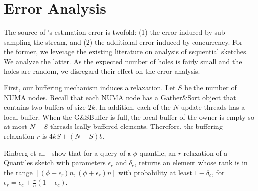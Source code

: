 \section{Error Analysis}
\label{sec:error-analysis}

The source of \mysketch's estimation error is twofold: (1) the error induced by sub-sampling the stream, and (2) the additional error induced by concurrency. For the former, we leverage the existing literature on analysis of sequential sketches. We analyze the latter. 
As the expected number of holes is fairly small and the holes are random, we disregard their effect on the error analysis. 

First, our buffering mechanism induces a relaxation. Let $S$ be the number of NUMA nodes. Recall that each NUMA node has a Gather\&Sort object that contains two buffers of size $2k$. In addition, each of the $N$ update threads has a local buffer. When the G\&SBuffer is full, the local buffer of the owner is empty so at most $N-S$ threads lcally buffered elements. Therefore, the buffering relaxation $r$ is $4kS+(N-S)b$.


Rinberg et al.~\cite{Rinberg_2020_fast_sketches} show that for a query of a $\phi$-quantile, an $r$-relaxation of a Quantiles sketch with parameters $\epsilon_c$ and $\delta_c$, returns an element whose rank is in the range $[(\phi-\epsilon_r)n,(\phi+\epsilon_r)n]$ with probability at least $1-\delta_c$, for $\epsilon_r=\epsilon_c+\frac{r}{n}(1-\epsilon_c)$.


